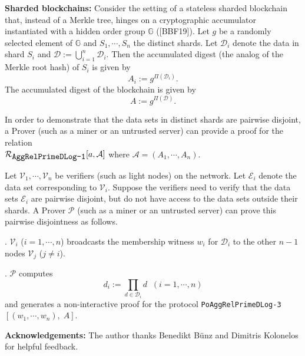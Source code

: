 \documentclass[11pt, lettersize, notitlepage, leqno, footskip=0.6cm]{article}
\newcommand{\pl}{\prod\limits}
\newcommand{\mc}{\mathcal}
\newcommand{\mb}{\mathbb}
\newcommand{\mP}{\mc{P}}
\newcommand{\V}{\mc{V}}
\newcommand{\vs}{\vspace{-0.15cm}}
\newcommand{\noin}{\noindent}
\numberwithin{equation}{section}
\begin{document}
\bigskip

\noin \textbf{Sharded blockchains:} Consider the setting of a stateless sharded blockchain that, instead of a Merkle tree, hinges on a cryptographic accumulator instantiated with a hidden order group $\mb{G}$ ([BBF19]). Let $g$ be a randomly selected element of $\mb{G}$ and $S_1,\cdots, S_n$ the distinct shards. Let $\mc{D}_i$ denote the data in shard $S_i$ and $\mc{D}:= \bigcup\limits_{i=1}^n \mc{D}_i$. Then the accumulated digest (the analog of the Merkle root hash) of $S_i$ is given by \vs $$A_i:= g^{\Pi(\mc{D}_i)}.$$  The accumulated digest of the blockchain is given by \vs $$A:= g^{\Pi(\mc{D})}.$$

In order to demonstrate that the data sets in distinct shards are pairwise disjoint, a Prover (such as a miner or an untrusted server) can provide a proof for the relation\\ $\mc{R}_{{\protect\verb|AggRelPrimeDLog-1|}}[a, \mc{A}]$ where $\mc{A} = (A_1,\cdots,A_n)$.\vspace{0.2cm}

Let $\V_1,\cdots,\V_n$ be verifiers (such as light nodes) on the network. Let $\mc{E}_i$ denote the data set corresponding to $\V_i$. Suppose the verifiers need to verify that the data sets $\mc{E}_i$ are pairwise disjoint, but do not have access to the data sets outside their shards. A Prover $\mP$ (such as a miner or an untrusted server) can prove this pairwise disjointness as follows.\vspace{0.1cm}

\noin 1. $\V_i$ ($i=1,\cdots,n$) broadcasts the membership witness $w_i$ for $\mc{D}_i$ to the other $n-1$ nodes $\V_j$ ($j\neq i$). 

\noin 2. $\mP$ computes \vs $$d_i:= \pl_{d\in\mc{D}_i} d\;\;(i=1,\cdots,n)$$ and generates a non-interactive proof for the protocol \verb|PoAggRelPrimeDLog-3|$[(w_1,\cdots,w_n),\; A]$.




\bigskip










\bigskip

\bigskip

\bigskip

\bigskip

\noin \textbf{Acknowledgements:} The author thanks Benedikt B\"{u}nz and Dimitris Kolonelos for helpful feedback.
\end{document}

